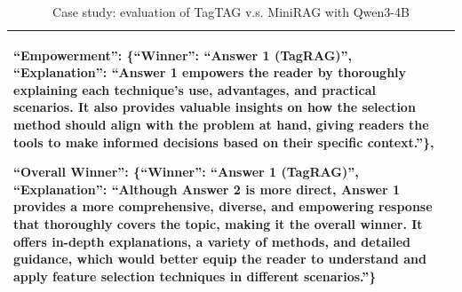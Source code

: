 \documentclass[11pt]{article}
\begin{document}
\begin{table}[h]
\begin{tabularx}{\textwidth}{p{2cm}|X}
    \textbf{``Empowerment''}: \{``Winner'': ``Answer 1 (TagRAG)'', ``Explanation'': ``Answer 1 empowers the reader by thoroughly explaining each technique's use, advantages, and practical scenarios. It also provides valuable insights on how the selection method should align with the problem at hand, giving readers the tools to make informed decisions based on their specific context.''\},
    
    \textbf{``Overall Winner''}: \{``Winner'': ``Answer 1 (TagRAG)'', ``Explanation'': ``Although Answer 2 is more direct, Answer 1 provides a more comprehensive, diverse, and empowering response that thoroughly covers the topic, making it the overall winner. It offers in-depth explanations, a variety of methods, and detailed guidance, which would better equip the reader to understand and apply feature selection techniques in different scenarios.''\} \\

    \bottomrule
\end{tabularx}
\caption{Case study: evaluation of TagTAG v.s. MiniRAG with Qwen3-4B}
\label{tab:TagTAG v.s. MiniRAG}
\end{table}






\clearpage
\end{document}
